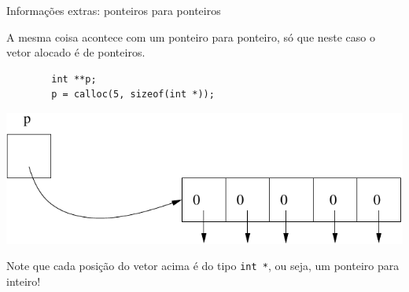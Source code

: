 \documentclass[handout]{beamer}
\newcommand{\cod}[1]{\texttt{#1}}
\begin{document}
\begin{frame}[fragile]{Informações extras: ponteiros para ponteiros}

    A mesma coisa acontece com um ponteiro para ponteiro, só que neste caso o vetor alocado é de ponteiros.

    \begin{verbatim}
        int **p;
        p = calloc(5, sizeof(int *));
    \end{verbatim}

    \begin{center}
        \includegraphics[scale=0.8]{pont4}
    \end{center}

    Note que cada posição do vetor acima é do tipo \cod{int *}, ou seja, um ponteiro para inteiro!

\end{frame}
\end{document}
